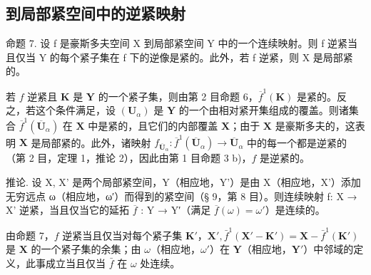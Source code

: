 \subsection{到局部紧空间中的逆紧映射}

命题 7. 设 f 是豪斯多夫空间 X 到局部紧空间 Y 中的一个连续映射。则 f 逆紧当且仅当 Y 的每个紧子集在 f 下的逆像是紧的。此外，若 f 逆紧，则 X 是局部紧的。

若 \(f\) 逆紧且 \(\mathbf{K}\) 是 \(\mathbf{Y}\) 的一个紧子集，则由第 2 目命题 6，\(\overline{f}^{1}(\mathbf{K})\) 是紧的。反之，若这个条件满足，设 \((\mathbf{U}_{\alpha})\) 是 \(\mathbf{Y}\) 的一个由相对紧开集组成的覆盖。则诸集合 \(\overline{f}^{1}(\overline{\mathbf{U}}_{\alpha})\) 在 \(\mathbf{X}\) 中是紧的，且它们的内部覆盖 \(\mathbf{X}\)；由于 \(\mathbf{X}\) 是豪斯多夫的，这表明 \(\mathbf{X}\) 是局部紧的。此外，诸映射 \(f_{\overline{\mathbf{U}}_{\alpha}}: \overline{f}^{1}(\overline{\mathbf{U}}_{\alpha}) \to \overline{\mathbf{U}}_{\alpha}\) 中的每一个都是逆紧的（第 2 目，定理 1，推论 2），因此由第 1 目命题 3 b)，\(f\) 是逆紧的。

推论. 设 X, X' 是两个局部紧空间，Y（相应地，Y'）是由 X（相应地，X'）添加无穷远点 ω（相应地，ω′）而得到的紧空间（§ 9，第 8 目）。则连续映射 f: X → X' 逆紧，当且仅当它的延拓 \(\overline{f}\) : Y → Y′（满足 \(\overline{f}(\omega) = \omega'\)）是连续的。

由命题 7，\(f\) 逆紧当且仅当对每个紧子集 \(\mathbf{K}'\)，\(\mathbf{X}', \bar{f}^1(\mathbf{X}' - \mathbf{K}') = \mathbf{X} - \bar{f}^1(\mathbf{K}')\) 是 \(\mathbf{X}\) 的一个紧子集的余集；由 \(\omega\)（相应地，\(\omega'\)）在 \(\mathbf{Y}\)（相应地，\(\mathbf{Y}'\)）中邻域的定义，此事成立当且仅当 \(\bar{f}\) 在 \(\omega\) 处连续。

